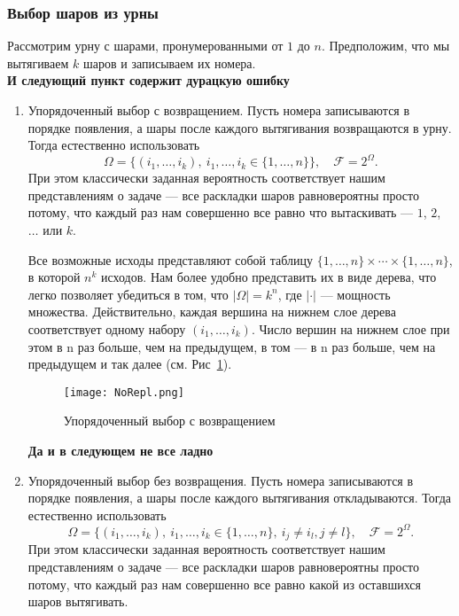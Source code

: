\documentclass[11 pt,russian]{article}
\begin{document}
\subsubsection{Выбор шаров из урны}
Рассмотрим урну с шарами, пронумерованными от $1$ до $n$. Предположим, что мы вытягиваем $k$ шаров и записываем их номера. \\
{\bf И следующий пункт содержит дурацкую ошибку}
\begin{enumerate}
\item Упорядоченный выбор с возвращением. Пусть номера записываются в порядке появления, а шары после каждого вытягивания возвращаются в урну. Тогда естественно использовать 
$$
\Omega = \{(i_1,\dotsc,i_k),\ i_1,\dotsc,i_k\in \{1,\dotsc,n\}\},\quad \mathcal{F} = 2^{\Omega}.
$$
При этом классически заданная вероятность соответствует нашим представлениям о задаче --- все раскладки шаров равновероятны просто потому, что каждый раз нам совершенно все равно что вытаскивать --- $1$, $2$, $\dotsc$ или $k$. 

Все возможные исходы представляют собой таблицу $\{1,\dotsc,n\}\times \dotsm \times \{1,\dotsc,n\}$, в которой $n^k$ исходов. Нам более удобно представить их в виде дерева, что легко позволяет убедиться в том, что $|\Omega| = k^n$, где $|\cdot|$ --- мощность множества. Действительно, каждая вершина на нижнем слое дерева соответствует одному набору $(i_1,\dotsc,i_k)$. Число вершин на нижнем слое при этом в n раз больше, чем на предыдущем, в том --- в n раз больше, чем на предыдущем и так далее (см. Рис~\ref{NoRepl}).
\begin{figure}[h!]
\caption{Упорядоченный выбор с возвращением}
\label{NoRepl}
   \begin{center}
   \texttt{[image: NoRepl.png]}
   \end{center}
\end{figure}
{\bf Да и в следующем не все ладно}
\item Упорядоченный выбор без возвращения. Пусть номера записываются в порядке появления, а шары после каждого вытягивания откладываются. Тогда естественно использовать
$$
\Omega = \{(i_1,\dotsc,i_k),\ i_1,\dotsc,i_k\in \{1,\dotsc,n\},\ i_j\neq i_l, j\neq l\},\quad \mathcal{F} = 2^{\Omega}.
$$
При этом классически заданная вероятность соответствует нашим представлениям о задаче --- все раскладки шаров равновероятны просто потому, что каждый раз нам совершенно все равно какой из оставшихся шаров вытягивать.


\end{enumerate}
\end{document}

